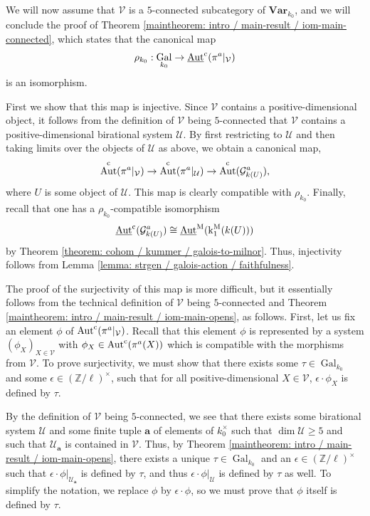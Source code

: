 \documentclass[11pt]{amsart}
\theoremstyle{definition}
\theoremstyle{remark}
\numberwithin{equation}{section}
\DeclareMathOperator{\Aut}{Aut}
\DeclareMathOperator{\Gal}{Gal}
\newcommand{\Z}{\mathbb{Z}}
\newcommand{\Vc}{\mathcal{V}}
\newcommand{\Gc}{\mathcal{G}}
\newcommand{\Ucal}{\mathcal{U}}
\newcommand{\abf}{\mathbf{a}}
\newcommand{\Autc}{\Aut^{\rm c}}
\newcommand{\UAutc}{\underline{\Aut}^{\rm c}}
\newcommand{\UAutm}{\underline{\Aut}^{\rm M}}
\renewcommand{\k}{\operatorname{k}^{\rm M}}
\newcommand{\Var}{\mathbf{Var}}
\newcommand{\Galk}{{\Gal_{k_0}}}
\begin{document}
We will now assume that $\Vc$ is a $5$-connected subcategory of $\Var_{k_0}$, and we will conclude the proof of Theorem \ref{maintheorem: intro / main-result / iom-main-connected}, which states that the canonical map 
\[ \rho_{k_0} : \Galk \rightarrow \UAutc(\pi^a|_\Vc) \]
is an isomorphism.

First we show that this map is injective.
Since $\Vc$ contains a positive-dimensional object, it follows from the definition of $\Vc$ being $5$-connected that $\Vc$ contains a positive-dimensional birational system $\Ucal$.
By first restricting to $\Ucal$ and then taking limits over the objects of $\Ucal$ as above, we obtain a canonical map,
\[ \Autc(\pi^a|_\Vc) \rightarrow \Autc(\pi^a|_\Ucal) \rightarrow \Autc(\Gc_{k(U)}^a), \]
where $U$ is some object of $\Ucal$.
This map is clearly compatible with $\rho_{k_0}$.
Finally, recall that one has a $\rho_{k_0}$-compatible isomorphism 
\[ \UAutc(\Gc_{k(U)}^a) \cong \UAutm(\k_1(k(U))) \]
by Theorem \ref{theorem: cohom / kummer / galois-to-milnor}.
Thus, injectivity follows from Lemma \ref{lemma: strgen / galois-action / faithfulness}.

The proof of the surjectivity of this map is more difficult, but it essentially follows from the technical definition of $\Vc$ being $5$-connected and Theorem \ref{maintheorem: intro / main-result / iom-main-opens}, as follows.
First, let us fix an element $\phi$ of $\Autc(\pi^a|_\Vc)$.
Recall that this element $\phi$ is represented by a system $(\phi_X)_{X \in \Vc}$ with $\phi_X \in \Autc(\pi^a(X))$ which is compatible with the morphisms from $\Vc$.
To prove surjectivity, we must show that there exists some $\tau \in \Galk$ and some $\epsilon \in (\Z/\ell)^\times$, such that for all positive-dimensional $X \in \Vc$, $\epsilon \cdot \phi_X$ is defined by $\tau$.

By the definition of $\Vc$ being $5$-connected, we see that there exists some birational system $\Ucal$ and some finite tuple $\abf$ of elements of $k_0^\times$ such that $\dim \Ucal \geq 5$ and such that $\Ucal_\abf$ is contained in $\Vc$.
Thus, by Theorem \ref{maintheorem: intro / main-result / iom-main-opens}, there exists a unique $\tau \in \Galk$ and an $\epsilon \in (\Z/\ell)^\times$ such that $\epsilon \cdot \phi|_{\Ucal_\abf}$ is defined by $\tau$, and thus $\epsilon \cdot \phi|_\Ucal$ is defined by $\tau$ as well.
To simplify the notation, we replace $\phi$ by $\epsilon \cdot \phi$, so we must prove that $\phi$ itself is defined by $\tau$.
\end{document}

